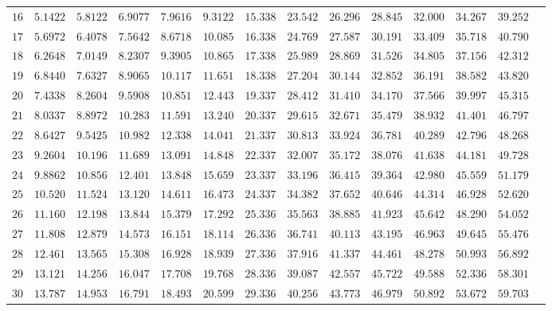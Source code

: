 \begin{center}
\begin{small}
\begin{longtable}[c]{rrrrrrrrrrrrrr}
 $16$ & $5.1422$ & $5.8122$ & $6.9077$ & $7.9616$ & $9.3122$ & $15.338$ & $23.542$ & $26.296$ & $28.845$ & $32.000$ & $34.267$ & $39.252$ \\ 
 $17$ & $5.6972$ & $6.4078$ & $7.5642$ & $8.6718$ & $10.085$ & $16.338$ & $24.769$ & $27.587$ & $30.191$ & $33.409$ & $35.718$ & $40.790$ \\ 
 $18$ & $6.2648$ & $7.0149$ & $8.2307$ & $9.3905$ & $10.865$ & $17.338$ & $25.989$ & $28.869$ & $31.526$ & $34.805$ & $37.156$ & $42.312$ \\ 
 $19$ & $6.8440$ & $7.6327$ & $8.9065$ & $10.117$ & $11.651$ & $18.338$ & $27.204$ & $30.144$ & $32.852$ & $36.191$ & $38.582$ & $43.820$ \\[4pt] 
 $20$ & $7.4338$ & $8.2604$ & $9.5908$ & $10.851$ & $12.443$ & $19.337$ & $28.412$ & $31.410$ & $34.170$ & $37.566$ & $39.997$ & $45.315$ \\ 
 $21$ & $8.0337$ & $8.8972$ & $10.283$ & $11.591$ & $13.240$ & $20.337$ & $29.615$ & $32.671$ & $35.479$ & $38.932$ & $41.401$ & $46.797$ \\ 
 $22$ & $8.6427$ & $9.5425$ & $10.982$ & $12.338$ & $14.041$ & $21.337$ & $30.813$ & $33.924$ & $36.781$ & $40.289$ & $42.796$ & $48.268$ \\ 
 $23$ & $9.2604$ & $10.196$ & $11.689$ & $13.091$ & $14.848$ & $22.337$ & $32.007$ & $35.172$ & $38.076$ & $41.638$ & $44.181$ & $49.728$ \\ 
 $24$ & $9.8862$ & $10.856$ & $12.401$ & $13.848$ & $15.659$ & $23.337$ & $33.196$ & $36.415$ & $39.364$ & $42.980$ & $45.559$ & $51.179$ \\ 
 $25$ & $10.520$ & $11.524$ & $13.120$ & $14.611$ & $16.473$ & $24.337$ & $34.382$ & $37.652$ & $40.646$ & $44.314$ & $46.928$ & $52.620$ \\ 
 $26$ & $11.160$ & $12.198$ & $13.844$ & $15.379$ & $17.292$ & $25.336$ & $35.563$ & $38.885$ & $41.923$ & $45.642$ & $48.290$ & $54.052$ \\ 
 $27$ & $11.808$ & $12.879$ & $14.573$ & $16.151$ & $18.114$ & $26.336$ & $36.741$ & $40.113$ & $43.195$ & $46.963$ & $49.645$ & $55.476$ \\ 
 $28$ & $12.461$ & $13.565$ & $15.308$ & $16.928$ & $18.939$ & $27.336$ & $37.916$ & $41.337$ & $44.461$ & $48.278$ & $50.993$ & $56.892$ \\ 
 $29$ & $13.121$ & $14.256$ & $16.047$ & $17.708$ & $19.768$ & $28.336$ & $39.087$ & $42.557$ & $45.722$ & $49.588$ & $52.336$ & $58.301$ \\
 $30$ & $13.787$ & $14.953$ & $16.791$ & $18.493$ & $20.599$ & $29.336$ & $40.256$ & $43.773$ & $46.979$ & $50.892$ & $53.672$ & $59.703$ \\ 
\end{longtable}
\end{small}
\end{center}

